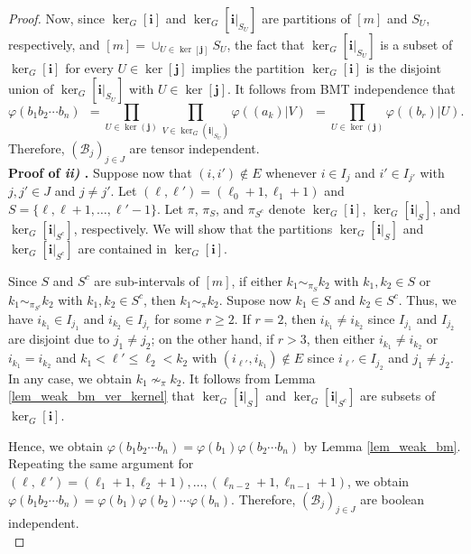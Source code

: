\documentclass[a4paper,12pt]{extarticle}
\theoremstyle{definition}
\theoremstyle{remark}
\begin{document}
\begin{proof}
	Now, since $\ker_G[\bm{i}]$ and $\ker_G[\bm{i}|_{S_U}]$ are partitions of $[m]$ and $S_U$, respectively, and $[m] = \cup_{U \in \ker[\bm{j}]} S_U$, the fact that $\ker_G[\bm{i}|_{S_U}]$ is a subset of $\ker_G[\bm{i}]$ for every $U \in \ker[\bm{j}]$ implies the partition $\ker_G[\bm{i}]$ is the disjoint union of $\ker_G[\bm{i}|_{S_U}]$ with $U \in \ker[\bm{j}]$. 
	It follows from BMT independence that    
	\[
	\varphi( b_1 b_2 \cdots b_n )
	\ \ =  
	\prod_{U \in \ker(\bm{j})} \prod_{ V \in \ker_G(\bm{i}|_{S_U})} \varphi \left( (a_k) | V  \right)
	\ \ =  \prod_{U \in \ker(\bm{j})}  \varphi \left( (b_r) | U  \right). 
	\]
	Therefore,  $(\mathcal{B}_j)_{j \in J}$ are tensor independent. \ \\
	
	
	
	\noindent \textbf{Proof of \emph{ii)}
		.} Suppose now that $(i,i') \notin E$ whenever $i \in I_{j}$ and $i' \in I_{j'}$ with $j,j' \in J$ and $j \neq j'$. 
	Let $(\ell,\ell') = (\ell_0+1,\ell_1+1 )$ and $S = \{ \ell, \ell+1, \ldots, \ell'-1 \}$. 
	Let $\pi$, $\pi_S$, and $\pi_{S^c}$ denote $\ker_G[\bm{i}]$, $\ker_G[\bm{i}|_S]$, and $\ker_G[\bm{i}|_{S^c}]$, respectively.  
	We will show that the partitions $\ker_G[\bm{i}|_S]$ and $\ker_G[\bm{i}|_{S^c}]$ are contained in  $\ker_G[\bm{i}]$. 
	
	Since $S$ and $S^c$ are sub-intervals of $[m]$, if either $k_1 \sim_{\pi_S} k_2$ with $k_1,k_2 \in S$ or $k_1 \sim_{\pi_{S^c}} k_2$ with $k_1,k_2 \in S^c$, then $k_1 \sim_\pi k_2$.
	Supose now $k_1 \in S$ and $k_2 \in S^c$. 
	Thus, we have $i_{k_1} \in I_{j_1}$ and $i_{k_2} \in I_{j_r}$ for some $r \geq 2$. 
	If $r=2$, then $i_{k_1} \neq i_{k_2}$ since $I_{j_1}$ and $I_{j_2}$ are disjoint due to $j_1 \neq j_2$;
	on the other hand, if $r >3$, then either $i_{k_1} \neq i_{k_2}$ or $i_{k_1} = i_{k_2}$ and $k_1 < \ell' \leq \ell_2 < k_2$ with  $(i_{\ell'},i_{k_1}) \notin E$ since $i_{\ell'} \in I_{j_2}$  and $j_1 \neq j_2$. 
	In any case, we obtain $k_1 \nsim_{\pi} k_2$. 
	It follows from Lemma \ref{lem_weak_bm_ver_kernel} that $\ker_G[\bm{i}|_S]$ and $\ker_G[\bm{i}|_{S^c}]$ are subsets of $\ker_G[\bm{i}]$. 
	
	Hence, we obtain $\varphi(b_1 b_2 \cdots b_n)  = \varphi(b_1) \varphi(b_2 \cdots b_n)$ by Lemma \ref{lem_weak_bm}.  
	Repeating the same argument for $(\ell,\ell')=(\ell_1+1,\ell_2+1),\ldots,(\ell_{n-2}+1,\ell_{n-1}+1)$, we obtain $\varphi(b_1 b_2 \cdots b_n)  = \varphi(b_1) \varphi(b_2) \cdots \varphi(b_n)$. 
	Therefore, $(\mathcal{B}_j)_{j \in J}$ are boolean independent. \ \\
	

\end{proof}
\end{document}
